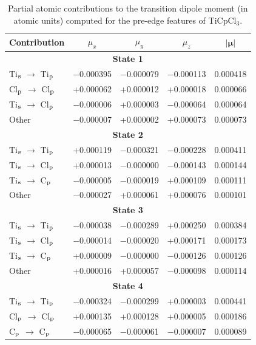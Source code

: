\documentclass{article}
\begin{document}
\begin{table}[t!]
	\centering
	\caption{Partial atomic contributions to the transition dipole moment (in atomic units) computed for the pre-edge features of TiCpCl$_3$.}
	\begin{tabular}{lcccc}
		\toprule
		Contribution                  &     $\mu_x$ &     $\mu_y$ &     $\mu_z$ & $|\boldsymbol\mu|$ \\ \midrule
\multicolumn{5}{c}{{\bf{State 1}}}   \\
Ti$_{\rm s}$ $\rightarrow$ Ti$_{\rm p}$ & $-$0.000395 & $-$0.000079 & $-$0.000113 & 0.000418 \\
Cl$_{\rm p}$ $\rightarrow$ Cl$_{\rm p}$ & +0.000062 & +0.000012 & +0.000018 & 0.000066 \\
Ti$_{\rm s}$ $\rightarrow$ Cl$_{\rm p}$ & $-$0.000006 & +0.000003 & $-$0.000064 & 0.000064 \\
Other       & $-$0.000007 & +0.000002 & +0.000073 & 0.000073 \\
\multicolumn{5}{c}{{\bf{State 2}}}   \\
Ti$_{\rm s}$ $\rightarrow$ Ti$_{\rm p}$ & +0.000119 & $-$0.000321 & $-$0.000228 & 0.000411 \\
Ti$_{\rm s}$ $\rightarrow$ Cl$_{\rm p}$ & +0.000013 & $-$0.000000 & $-$0.000143 & 0.000144 \\
Ti$_{\rm s}$ $\rightarrow$ C$_{\rm p}$ & $-$0.000005 & $-$0.000019 & +0.000109 & 0.000111 \\
Other       & $-$0.000027 & +0.000061 & +0.000076 & 0.000101 \\
\multicolumn{5}{c}{{\bf{State 3}}}   \\
Ti$_{\rm s}$ $\rightarrow$ Ti$_{\rm p}$ & $-$0.000038 & $-$0.000289 & +0.000250 & 0.000384 \\
Ti$_{\rm s}$ $\rightarrow$ Cl$_{\rm p}$ & $-$0.000014 & $-$0.000020 & +0.000171 & 0.000173 \\
Ti$_{\rm s}$ $\rightarrow$ C$_{\rm p}$ & +0.000009 & $-$0.000000 & $-$0.000126 & 0.000126 \\
Other       & +0.000016 & +0.000057 & $-$0.000098 & 0.000114 \\
\multicolumn{5}{c}{{\bf{State 4}}}   \\
Ti$_{\rm s}$ $\rightarrow$ Ti$_{\rm p}$ & $-$0.000324 & $-$0.000299 & +0.000003 & 0.000441 \\
Cl$_{\rm p}$ $\rightarrow$ Cl$_{\rm p}$ & +0.000135 & +0.000128 & +0.000005 & 0.000186 \\
C$_{\rm p}$ $\rightarrow$ C$_{\rm p}$ & $-$0.000065 & $-$0.000061 & $-$0.000007 & 0.000089 \\

\end{tabular}
\end{table}
\end{document}
